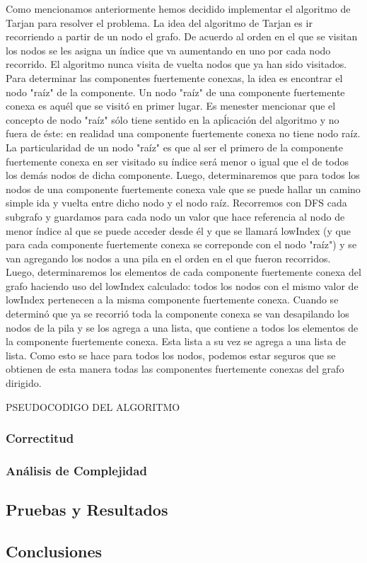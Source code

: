 \quad Como mencionamos anteriormente hemos decidido implementar el algoritmo de Tarjan para resolver el problema. La idea del algoritmo de Tarjan es ir recorriendo a partir de un nodo el grafo. De acuerdo al orden en el que se visitan los nodos se les asigna un índice que va aumentando en uno por cada nodo recorrido. El algoritmo nunca visita de vuelta nodos que ya han sido visitados. Para determinar las componentes fuertemente conexas, la idea es encontrar el nodo "raíz" de la componente. Un nodo "raíz" de una componente fuertemente conexa es aquél que se visitó en primer lugar. Es menester mencionar que el concepto de nodo "raíz" sólo tiene sentido en la apĺicación del algoritmo y no fuera de éste: en realidad una componente fuertemente conexa no tiene nodo raíz. La particularidad de un nodo "raíz" es que al ser el primero de la componente fuertemente conexa en ser visitado su índice será menor o igual que el de todos los demás nodos de dicha componente. Luego, determinaremos que para todos los nodos de una componente fuertemente conexa vale que se puede hallar un camino simple ida y vuelta entre dicho nodo y el nodo raíz. 
\quad Recorremos con DFS cada subgrafo y guardamos para cada nodo un valor que hace referencia al nodo de menor índice al que se puede acceder desde él y que se llamará lowIndex (y que para cada componente fuertemente conexa se correponde con el nodo "raíz") y se van  agregando los nodos a una pila en el orden en el que fueron recorridos. Luego, determinaremos los elementos de cada componente fuertemente conexa del grafo haciendo uso del lowIndex calculado: todos los nodos con el mismo valor de lowIndex pertenecen a la misma componente fuertemente conexa. Cuando se determinó que ya se recorrió toda la componente conexa se van desapilando los nodos de la pila y se los agrega a una lista, que contiene a todos los elementos de la componente fuertemente conexa. Esta lista a su vez se agrega a una lista de lista.  Como esto se hace para todos los nodos, podemos estar seguros que se obtienen de esta manera todas las componentes fuertemente conexas del grafo dirigido.


PSEUDOCODIGO DEL ALGORITMO


\subsubsection{Correctitud}



\subsubsection{Análisis de Complejidad}



\subsection{Pruebas y Resultados}


\subsection{Conclusiones}


